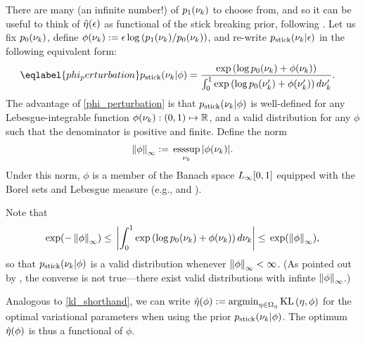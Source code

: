 There are many (an infinite number!) of $p_{1}(\nu_{k})$ to choose from, and so it
can be useful to think of $\hat\eta(\epsilon)$ as functional of the stick
breaking prior, following \citet{gustafson:1996:local}.  Let us fix $p_{0}(\nu_{k})$,
define $\phi(\nu_{k}) := \epsilon \log \left(p_{1}(\nu_{k}) / p_{0}(\nu_{k})\right)$, and
re-write $p_{\mathrm{stick}}(\nu_{k} \vert \epsilon)$ in the following equivalent form:
%
\begin{align}\eqlabel{phi_perturbation}
%
\pstick(\nuk \vert \phi) ={}&
\frac{\exp\left(\log \pb(\nuk) + \phi(\nuk)\right)}
     {\int_0^1 \exp\left(\log \pb(\nuk') + \phi(\nuk')\right) d\nuk'}.
%
\end{align}
%
The advantage of \eqref{phi_perturbation} is that $p_{\mathrm{stick}}(\nu_{k} \vert \phi)$ is
well-defined for any Lebesgue-integrable function $\phi(\nu_{k}):
(0,1)\mapsto\mathbb{R}$, and a valid distribution for any $\phi$ such that the
denominator is positive and finite.
Define the norm
%
\begin{align*}
%
\norminf{\phi} :={} \esssup_{\nuk} |\phi(\nuk)|.
%
\end{align*}
%
Under this norm, $\phi$ is a member of the Banach space ${L_{\infty}[0,1]}$ equipped with
the Borel sets and Lebesgue measure (e.g.,
\citet[Section 2.1, Example 5]{luenberger:1997:optimization} and
\citet[Theorem 5.2.1]{dudley:2018:real}).

Note that
%
\begin{align*}
%
\exp(-\norminf{\phi}) \le{}
\abs{\int_0^1 \exp\left(\log \pb(\nuk) + \phi(\nuk)\right) d\nuk}
\le{}
\exp(\norminf{\phi}),
%
\end{align*}
%
so that $p_{\mathrm{stick}}(\nu_{k} \vert \phi)$ is a valid distribution whenever
$\left\Vert\phi\right\Vert_{\infty} < \infty$.  (As pointed out by \citet{gustafson:1996:local}, the
converse is not true---there exist valid distributions with infinte
$\left\Vert\phi\right\Vert_{\infty}$.)

Analogous to \eqref{kl_shorthand}, we can write $\hat\eta(\phi) := \operatorname*{\mathrm{argmin}}_{\eta
\in \Omega_{\eta}} \mathrm{KL}\left(\eta, \phi\right)$ for the optimal variational parameters when
using the prior $p_{\mathrm{stick}}(\nu_{k} \vert \phi)$.  The optimum $\hat\eta(\phi)$
is thus a functional of $\phi$.

